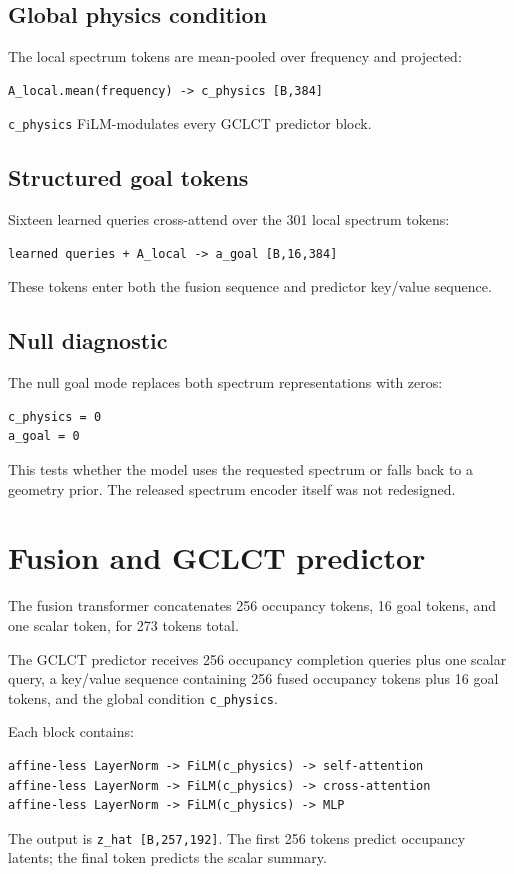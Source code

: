 \documentclass[11pt,a4paper]{article}
\begin{document}
\subsection{Global physics condition}
The local spectrum tokens are mean-pooled over frequency and projected:
\begin{lstlisting}
A_local.mean(frequency) -> c_physics [B,384]
\end{lstlisting}
\texttt{c\_physics} FiLM-modulates every GCLCT predictor block.

\subsection{Structured goal tokens}
Sixteen learned queries cross-attend over the 301 local spectrum tokens:
\begin{lstlisting}
learned queries + A_local -> a_goal [B,16,384]
\end{lstlisting}
These tokens enter both the fusion sequence and predictor key/value sequence.

\subsection{Null diagnostic}
The null goal mode replaces both spectrum representations with zeros:
\begin{lstlisting}
c_physics = 0
a_goal = 0
\end{lstlisting}
This tests whether the model uses the requested spectrum or falls back to a
geometry prior. The released spectrum encoder itself was not redesigned.

\section{Fusion and GCLCT predictor}
The fusion transformer concatenates 256 occupancy tokens, 16 goal tokens, and
one scalar token, for 273 tokens total.

The GCLCT predictor receives 256 occupancy completion queries plus one scalar
query, a key/value sequence containing 256 fused occupancy tokens plus 16 goal
tokens, and the global condition \texttt{c\_physics}.

Each block contains:
\begin{lstlisting}
affine-less LayerNorm -> FiLM(c_physics) -> self-attention
affine-less LayerNorm -> FiLM(c_physics) -> cross-attention
affine-less LayerNorm -> FiLM(c_physics) -> MLP
\end{lstlisting}
The output is \texttt{z\_hat [B,257,192]}. The first 256 tokens predict
occupancy latents; the final token predicts the scalar summary.
\end{document}
